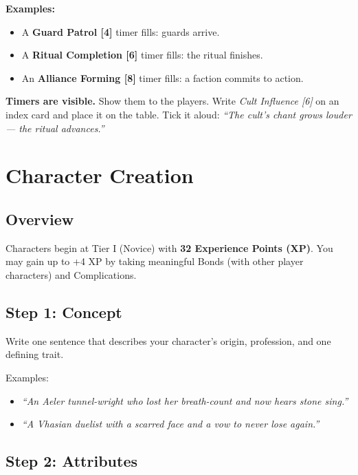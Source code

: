 \documentclass[11pt]{book}
\begin{document}
\textbf{Examples:}
\begin{itemize}
  \item A \textbf{Guard Patrol [4]} timer fills: guards arrive.
  \item A \textbf{Ritual Completion [6]} timer fills: the ritual finishes.
  \item An \textbf{Alliance Forming [8]} timer fills: a faction commits to action.
\end{itemize}

\begin{tipbox}
\textbf{Timers are visible.} Show them to the players. Write \textit{Cult Influence [6]} on an index card and place it on the table. Tick it aloud: \textit{``The cult's chant grows louder --- the ritual advances.''}
\end{tipbox}

\clearpage

\chapter{Character Creation}
\label{ch:character-creation}

\section{Overview}

Characters begin at Tier I (Novice) with \textbf{32 Experience Points (XP)}. You may gain up to +4 XP by taking meaningful Bonds (with other player characters) and Complications.

\section{Step 1: Concept}

Write one sentence that describes your character's origin, profession, and one defining trait.

Examples:
\begin{itemize}
  \item \textit{``An Aeler tunnel-wright who lost her breath-count and now hears stone sing.''}
  \item \textit{``A Vhasian duelist with a scarred face and a vow to never lose again.''}
\end{itemize}

\section{Step 2: Attributes}
\end{document}
